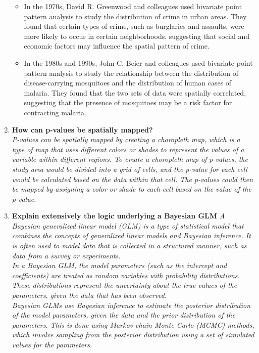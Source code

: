 \documentclass{article}
\begin{document}
\begin{enumerate}
{\begin{itemize}
        \item In the 1970s, David R. Greenwood and colleagues used bivariate point pattern analysis to study the distribution of crime in urban areas. They found that certain types of crime, such as burglaries and assaults, were more likely to occur in certain neighborhoods, suggesting that social and economic factors may influence the spatial pattern of crime.
        \item In the 1980s and 1990s, John C. Beier and colleagues used bivariate point pattern analysis to study the relationship between the distribution of disease-carrying mosquitoes and the distribution of human cases of malaria. They found that the two sets of data were spatially correlated, suggesting that the presence of mosquitoes may be a risk factor for contracting malaria.
        \end{itemize}
    }
    \item \textbf{How can p-values be spatially mapped?} \\
    \textit{P-values can be spatially mapped by creating a choropleth map, which is a type of map that uses different colors or shades to represent the values of a variable within different regions. To create a choropleth map of p-values, the study area would be divided into a grid of cells, and the p-value for each cell would be calculated based on the data within that cell. The p-values could then be mapped by assigning a color or shade to each cell based on the value of the p-value.}
    \item \textbf{Explain extensively the logic underlying a Bayesian GLM}
    \textit{A Bayesian generalized linear model (GLM) is a type of statistical model that combines the concepts of generalized linear models and Bayesian inference. It is often used to model data that is collected in a structured manner, such as data from a survey or experiments.\\
    In a Bayesian GLM, the model parameters (such as the intercept and coefficients) are treated as random variables with probability distributions. These distributions represent the uncertainty about the true values of the parameters, given the data that has been observed.\\
    Bayesian GLMs use Bayesian inference to estimate the posterior distribution of the model parameters, given the data and the prior distribution of the parameters. This is done using Markov chain Monte Carlo (MCMC) methods, which involve sampling from the posterior distribution using a set of simulated values for the parameters.\\
}
\end{enumerate}
\end{document}
